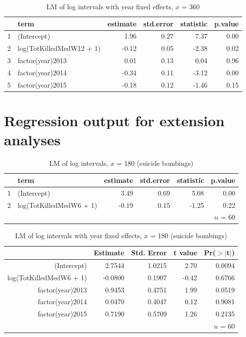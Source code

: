 \documentclass[letterpaper,12pt]{article}
\theoremstyle{definition}
\begin{document}
\begin{table}[h!]
\centering
\caption {LM of log intervals with year fixed effects, $x$ = 360}
\begin{tabular}{rlrrrr}
  \hline
 & term & estimate & std.error & statistic & p.value \\ 
  \hline
1 & (Intercept) & 1.96 & 0.27 & 7.37 & 0.00 \\ 
  2 & log(TotKilledMedW12 + 1) & -0.12 & 0.05 & -2.38 & 0.02 \\ 
  3 & factor(year)2013 & 0.01 & 0.13 & 0.04 & 0.96 \\ 
  4 & factor(year)2014 & -0.34 & 0.11 & -3.12 & 0.00 \\ 
  5 & factor(year)2015 & -0.18 & 0.12 & -1.46 & 0.15 \\ 
   \hline
\end{tabular}
\end{table}

\newpage
\section{Regression output for extension analyses}

\begin{table}[h!]
\centering
\caption {LM of log intervals, $x$ = 180 (suicide bombings)}
\begin{tabular}{rlrrrr}
  \hline
 & term & estimate & std.error & statistic & p.value \\ 
  \hline
1 & (Intercept) & 3.49 & 0.69 & 5.08 & 0.00 \\ 
  2 & log(TotKilledMedW6 + 1) & -0.19 & 0.15 & -1.25 & 0.22 \\ 
   \hline
&&&&&$n$ = 60
\end{tabular}
\end{table}

\begin{table}[h!]
\centering
\caption {LM of log intervals with year fixed effects, $x$ = 180 (suicide bombings)}
\begin{tabular}{rrrrr}
  \hline
 & Estimate & Std. Error & t value & Pr($>$$|$t$|$) \\ 
  \hline
(Intercept) & 2.7544 & 1.0215 & 2.70 & 0.0094 \\ 
  log(TotKilledMedW6 + 1) & -0.0800 & 0.1907 & -0.42 & 0.6766 \\ 
  factor(year)2013 & 0.9453 & 0.4751 & 1.99 & 0.0519 \\ 
  factor(year)2014 & 0.0470 & 0.4047 & 0.12 & 0.9081 \\ 
  factor(year)2015 & 0.7190 & 0.5709 & 1.26 & 0.2135 \\ 
   \hline
&&&&$n$ = 60
\end{tabular}
\end{table}
\end{document}
